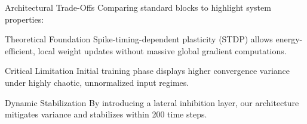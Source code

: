 \begin{frame}{Architectural Trade-Offs}
  Comparing standard blocks to highlight system properties:

  \begin{block}{Theoretical Foundation}
    Spike-timing-dependent plasticity (STDP) allows energy-efficient, local weight updates without massive global gradient computations.
  \end{block}
  
  \begin{alertblock}{Critical Limitation}
    Initial training phase displays higher convergence variance under highly chaotic, unnormalized input regimes.
  \end{alertblock}
  
  \begin{exampleblock}{Dynamic Stabilization}
    By introducing a lateral inhibition layer, our architecture mitigates variance and stabilizes within 200 time steps.
  \end{exampleblock}
\end{frame}

